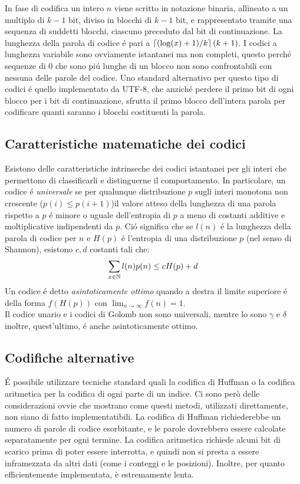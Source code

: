 In fase di codifica un intero $n$ viene scritto in notazione binaria, allineato a un multiplo di $k - 1$ bit, diviso in blocchi di $k - 1$ bit, e rappresentato tramite una sequenza di suddetti blocchi, ciascuno preceduto dal bit di continuazione. La lunghezza della parola di codice é pari a $\left\lceil (\log(x) + 1) / k \right\rceil(k + 1)$. I codici a lunghezza variabile sono ovviamente istantanei ma non completi, questo perché sequenze di 0 che sono piú lunghe di un blocco non sono confrontabili con nessuna delle parole del codice. Uno standard alternativo per questo tipo di codici é quello implementato da UTF-8, che anziché perdere il primo bit di ogni blocco per i bit di continuazione, sfrutta il primo blocco dell'intera parola per codificare quanti saranno i blocchi costituenti la parola.


\subsection{Caratteristiche matematiche dei codici}
Esistono delle caratteristiche intrinseche dei codici istantanei per gli interi che permettono di classificarli e distinguerne il comportamento. In particolare, un codice é \textit{universale} se per qualunque distribuzione $p$ sugli interi monotona non crescente ($p(i) \leq p(i + 1)$)il valore atteso della lunghezza di una parola rispetto a $p$ é minore o uguale dell'entropia di $p$ a meno di costanti additive e moltiplicative indipendenti da $p$. Ció significa che se $l(n)$ é la lunghezza della parola di codice per $n$ e $H(p)$ é l'entropia di una distribuzione $p$ (nel senso di Shannon), esistono $c, d$ costanti tali che:
\begin{equation*}
    \sum_{x \in \mathbb{N}}{l(n)p(n)} \leq cH(p) + d
\end{equation*}
Un codice é detto \textit{asintoticamente ottimo} quando a destra il limite superiore é della forma $f(H(p))$ con $\lim_{n \to \infty} f(n) = 1$.\\
Il codice unario e i codici di Golomb non sono universali, mentre lo sono $\gamma$ e $\delta$ inoltre, quest'ultimo, é anche asintoticamente ottimo.
\subsection{Codifiche alternative}
É possibile utilizzare tecniche standard quali la codifica di Huffman o la codifica aritmetica per la codifica di ogni parte di un indice. Ci sono però delle considerazioni ovvie che mostrano come questi metodi, utilizzati direttamente, non siano di fatto implementatibili. La codifica di Huffman richiederebbe un numero di parole di codice esorbitante, e le parole dovrebbero essere calcolate separatamente per ogni termine. La codifica aritmetica richiede alcuni bit di scarico prima di poter essere interrotta, e quindi non si presta a essere inframezzata da altri dati (come i conteggi e le posizioni). Inoltre, per quanto efficientemente implementata, è estremamente lenta.
